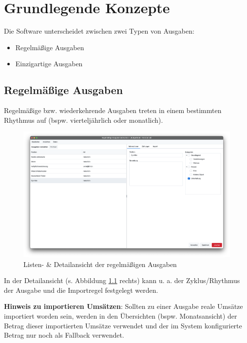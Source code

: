 \chapter{Grundlegende Konzepte}

Die Software unterscheidet zwischen zwei Typen von Ausgaben:

\begin{itemize}[nosep]
	\item Regelmäßige Ausgaben
	\item Einzigartige Ausgaben
\end{itemize}

\section{Regelmäßige Ausgaben} \label{sec:fixedExpenses}

Regelmäßige bzw. wiederkehrende Ausgaben treten in einem bestimmten Rhythmus auf (bspw. vierteljährlich oder monatlich).

\begin{figure}[h!]
	\centering
	\includegraphics[width=\textwidth]{img/Screenshot-FixedExpenses-MDV}
	\vspace{-2em}
	\caption{Listen- \& Detailansicht der regelmäßigen Ausgaben}
	\label{fig:mdvFixedExpenses}
\end{figure}

In der Detailansicht (s. Abbildung \ref{fig:mdvFixedExpenses} rechts) kann u. a. der Zyklus/Rhythmus der Ausgabe und die Importregel festgelegt werden. 

\begin{infobox}
\textbf{Hinweis zu importieren Umsätzen}: Sollten zu einer Ausgabe reale Umsätze importiert worden sein, werden in den Übersichten (bspw. Monatsansicht) der Betrag dieser importierten Umsätze verwendet und der im System konfigurierte Betrag nur noch als Fallback verwendet. 
\end{infobox}

